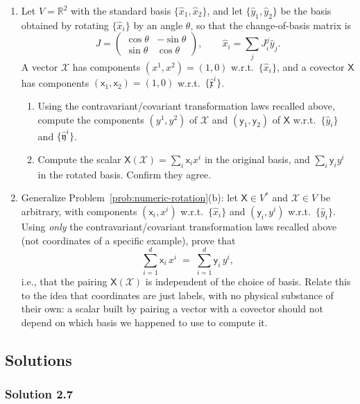 \documentclass[11pt]{article}
\newcommand{\dual}{V^{*}}
\begin{document}
\begin{enumerate}[label=\textbf{2.\arabic*}, leftmargin=2.2cm, start=7]
\item \label{prob:numeric-rotation}
Let $V = \mathbb{R}^2$ with the standard basis $\{\hat{x}_1,\hat{x}_2\}$, and let $\{\hat{y}_1,\hat{y}_2\}$ be the basis obtained by rotating $\{\hat{x}_i\}$ by an angle $\theta$, so that the change-of-basis matrix is
\[
J = \begin{pmatrix} \cos\theta & -\sin\theta \\ \sin\theta & \cos\theta \end{pmatrix}, \qquad \hat{x}_i = \sum_j J_i^j \hat{y}_j.
\]
A vector $\mathcal{X}$ has components $(x^1,x^2) = (1,0)$ w.r.t.\ $\{\hat{x}_i\}$, and a covector $\mathsf{X}$ has components $(\mathsf{x}_1,\mathsf{x}_2) = (1,0)$ w.r.t.\ $\{\hat{\mathfrak{x}}^i\}$.
\begin{enumerate}[label=(\alph*)]
  \item Using the contravariant/covariant transformation laws recalled above, compute the components $(y^1,y^2)$ of $\mathcal{X}$ and $(\mathsf{y}_1,\mathsf{y}_2)$ of $\mathsf{X}$ w.r.t.\ $\{\hat{y}_i\}$ and $\{\hat{\mathfrak{y}}^i\}$.
  \item Compute the scalar $\mathsf{X}(\mathcal{X}) = \sum_i \mathsf{x}_i x^i$ in the original basis, and $\sum_i \mathsf{y}_i y^i$ in the rotated basis. Confirm they agree.
\end{enumerate}

\item \label{prob:invariance}
Generalize Problem~\ref{prob:numeric-rotation}(b): let $\mathsf{X} \in \dual$ and $\mathcal{X} \in V$ be arbitrary, with components $(\mathsf{x}_i, x^i)$ w.r.t.\ $\{\hat{x}_i\}$ and $(\mathsf{y}_i, y^i)$ w.r.t.\ $\{\hat{y}_i\}$. Using \emph{only} the contravariant/covariant transformation laws recalled above (not coordinates of a specific example), prove that
\[
\sum_{i=1}^d \mathsf{x}_i\, x^i \;=\; \sum_{i=1}^d \mathsf{y}_i\, y^i,
\]
i.e., that the pairing $\mathsf{X}(\mathcal{X})$ is independent of the choice of basis. Relate this to the idea that coordinates are just labels, with no physical substance of their own: a scalar built by pairing a vector with a covector should not depend on which basis we happened to use to compute it.

\end{enumerate}

\subsection*{Solutions}

\subsubsection*{Solution 2.7}
\end{document}
